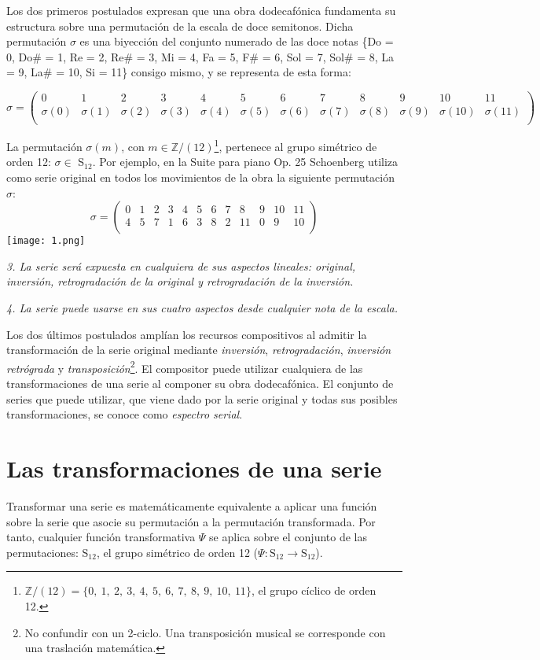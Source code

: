 		Los dos primeros postulados expresan que una obra dodecafónica fundamenta su estructura sobre una permutación de la escala de doce semitonos. Dicha permutación $\sigma$ es una biyección del conjunto numerado de las doce notas \{Do = 0, Do\# = 1, Re = 2, Re\# = 3, Mi = 4, Fa = 5, F\# = 6, Sol = 7, Sol\# = 8, La = 9, La\# = 10, Si = 11\} consigo mismo, y se representa de esta forma:
		\begin{footnotesize}
			$$
			\sigma=\left(\begin{matrix}0&1&2&3&4&5&6&7&8&9&10&11\\\sigma(0)&\sigma(1)&\sigma(2)&\sigma(3)&\sigma(4)&\sigma(5)&\sigma(6)&\sigma(7)&\sigma(8)&\sigma(9)&\sigma(10)&\sigma(11)\\\end{matrix}\right)
			$$
		\end{footnotesize}	
		La permutación $\sigma(m)$, con $m\in \mathbb{Z} / (12)$\footnote{$\mathbb{Z} / (12)=\{0,\ 1,\ 2,\ 3,\ 4,\ 5,\ 6,\ 7,\ 8,\ 9,\ 10,\ 11\}$, el grupo cíclico de orden 12.}, pertenece al grupo simétrico de orden 12: $\sigma\in$ S$_{12}$. Por ejemplo, en la Suite para piano Op. 25 Schoenberg utiliza como serie original en todos los movimientos de la obra la siguiente permutación $\sigma$:
		$$\sigma=\left(\begin{matrix}0&1&2&3&4&5&6&7&8&9&10&11\\4&5&7&1&6&3&8&2&11&0&9&10\\\end{matrix}\right)$$	
		\texttt{[image: 1.png]}
		
		\emph{3. La serie será expuesta en cualquiera de sus aspectos lineales: original, inversión, retrogradación de la original y retrogradación de la inversión.}
		 
		\emph{4. La serie puede usarse en sus cuatro aspectos desde cualquier nota de la escala.}
		
		Los dos últimos postulados amplían los recursos compositivos al admitir la transformación de la serie original mediante \emph{inversión}, \emph{retrogradación}, \emph{inversión retrógrada} y \emph{transposición}\footnote{No confundir con un 2-ciclo. Una transposición musical se corresponde con una traslación matemática.}. El compositor puede utilizar cualquiera de las transformaciones de una serie al componer su obra dodecafónica. El conjunto de series que puede utilizar, que viene dado por la serie original y todas sus posibles transformaciones, se conoce como \emph{espectro serial}.
		
	\section{Las transformaciones de una serie}
		\label{transPsi}
		Transformar una serie es matemáticamente equivalente a aplicar una función sobre la serie que asocie su permutación a la permutación transformada. Por tanto, cualquier función transformativa $\Psi$ se aplica sobre el conjunto de las permutaciones: S$_{12}$, el grupo simétrico de orden 12 ($\Psi:\text{S}_{12}\rightarrow\text{S}_{12}$).
		
